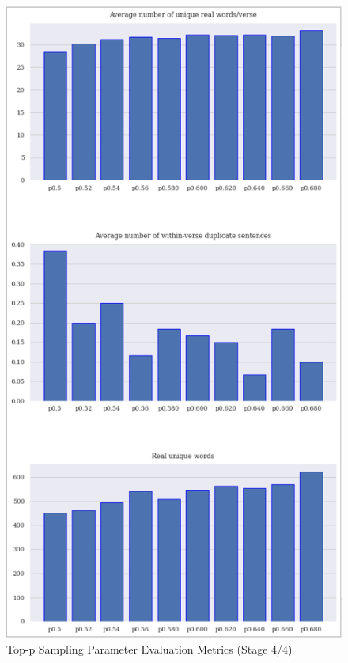 \begin{figure}[h]
    \centering
    \includegraphics[scale=0.85,keepaspectratio=true]{figures/top-p_param_eval_s4.png}
    \caption{Top-p Sampling Parameter Evaluation Metrics (Stage 4/4)}
    \label{fig:top-p-param-eval-s4}
\end{figure}

